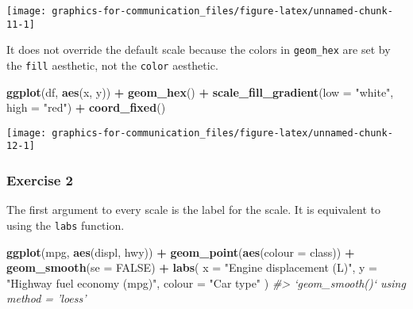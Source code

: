 \documentclass[]{book}
\newenvironment{Shaded}{\begin{snugshade}}{\end{snugshade}}
\newcommand{\CommentTok}[1]{\textcolor[rgb]{0.56,0.35,0.01}{\textit{#1}}}
\newcommand{\DataTypeTok}[1]{\textcolor[rgb]{0.13,0.29,0.53}{#1}}
\newcommand{\KeywordTok}[1]{\textcolor[rgb]{0.13,0.29,0.53}{\textbf{#1}}}
\newcommand{\NormalTok}[1]{#1}
\newcommand{\OperatorTok}[1]{\textcolor[rgb]{0.81,0.36,0.00}{\textbf{#1}}}
\newcommand{\OtherTok}[1]{\textcolor[rgb]{0.56,0.35,0.01}{#1}}
\newcommand{\StringTok}[1]{\textcolor[rgb]{0.31,0.60,0.02}{#1}}
\theoremstyle{definition}
\theoremstyle{definition}
\theoremstyle{definition}
\theoremstyle{remark}
\begin{document}
\begin{center}\texttt{[image: graphics-for-communication\_files/figure-latex/unnamed-chunk-11-1]} \end{center}

It does not override the default scale because the colors in
\texttt{geom\_hex} are set by the \texttt{fill} aesthetic, not the
\texttt{color} aesthetic.

\begin{Shaded}
\begin{Highlighting}[]
\KeywordTok{ggplot}\NormalTok{(df, }\KeywordTok{aes}\NormalTok{(x, y)) }\OperatorTok{+}
\StringTok{  }\KeywordTok{geom_hex}\NormalTok{() }\OperatorTok{+}
\StringTok{  }\KeywordTok{scale_fill_gradient}\NormalTok{(}\DataTypeTok{low =} \StringTok{"white"}\NormalTok{, }\DataTypeTok{high =} \StringTok{"red"}\NormalTok{) }\OperatorTok{+}
\StringTok{  }\KeywordTok{coord_fixed}\NormalTok{()}
\end{Highlighting}
\end{Shaded}

\begin{center}\texttt{[image: graphics-for-communication\_files/figure-latex/unnamed-chunk-12-1]} \end{center}

\hypertarget{exercise-2-68}{%
\subsubsection{Exercise 2}\label{exercise-2-68}}

The first argument to every scale is the label for the scale. It is
equivalent to using the \texttt{labs} function.

\begin{Shaded}
\begin{Highlighting}[]
\KeywordTok{ggplot}\NormalTok{(mpg, }\KeywordTok{aes}\NormalTok{(displ, hwy)) }\OperatorTok{+}
\StringTok{  }\KeywordTok{geom_point}\NormalTok{(}\KeywordTok{aes}\NormalTok{(}\DataTypeTok{colour =}\NormalTok{ class)) }\OperatorTok{+}
\StringTok{  }\KeywordTok{geom_smooth}\NormalTok{(}\DataTypeTok{se =} \OtherTok{FALSE}\NormalTok{) }\OperatorTok{+}
\StringTok{  }\KeywordTok{labs}\NormalTok{(}
    \DataTypeTok{x =} \StringTok{"Engine displacement (L)"}\NormalTok{,}
    \DataTypeTok{y =} \StringTok{"Highway fuel economy (mpg)"}\NormalTok{,}
    \DataTypeTok{colour =} \StringTok{"Car type"}
\NormalTok{  )}
\CommentTok{#> `geom_smooth()` using method = 'loess'}
\end{Highlighting}
\end{Shaded}
\end{document}
